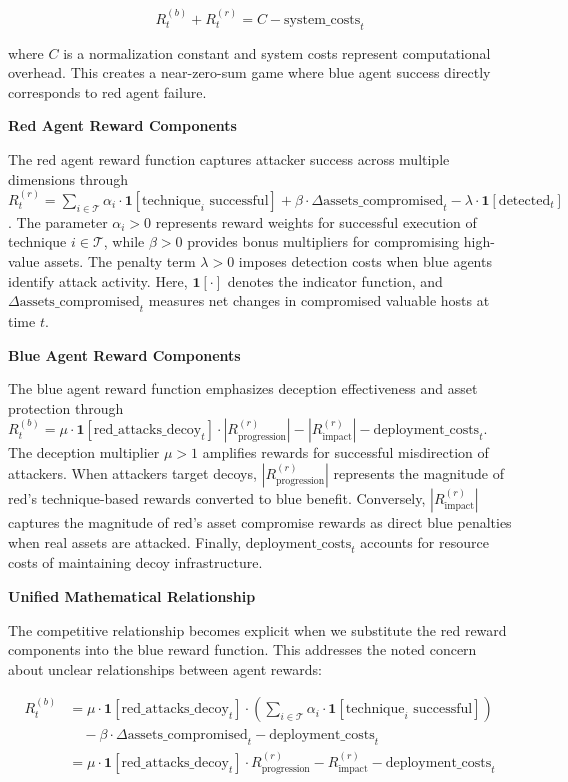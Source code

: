 \documentclass[12pt,oneside]{article}
\begin{document}
\begin{equation}
R^{(b)}_t + R^{(r)}_t = C - \text{system\_costs}_t
\end{equation}

where $C$ is a normalization constant and system costs represent computational overhead. This creates a near-zero-sum game where blue agent success directly corresponds to red agent failure.

\textbf{Red Agent Reward Components}

The red agent reward function captures attacker success across multiple dimensions through $R^{(r)}_t = \sum_{i \in \mathcal{T}} \alpha_i \cdot \mathbf{1}[\text{technique}_i \text{ successful}] + \beta \cdot \Delta\text{assets\_compromised}_t - \lambda \cdot \mathbf{1}[\text{detected}_t]$. The parameter $\alpha_i > 0$ represents reward weights for successful execution of technique $i \in \mathcal{T}$, while $\beta > 0$ provides bonus multipliers for compromising high-value assets. The penalty term $\lambda > 0$ imposes detection costs when blue agents identify attack activity. Here, $\mathbf{1}[\cdot]$ denotes the indicator function, and $\Delta\text{assets\_compromised}_t$ measures net changes in compromised valuable hosts at time $t$.

\textbf{Blue Agent Reward Components}

The blue agent reward function emphasizes deception effectiveness and asset protection through $R^{(b)}_t = \mu \cdot \mathbf{1}[\text{red\_attacks\_decoy}_t] \cdot |R^{(r)}_{\text{progression}}| - |R^{(r)}_{\text{impact}}| - \text{deployment\_costs}_t$. The deception multiplier $\mu > 1$ amplifies rewards for successful misdirection of attackers. When attackers target decoys, $|R^{(r)}_{\text{progression}}|$ represents the magnitude of red's technique-based rewards converted to blue benefit. Conversely, $|R^{(r)}_{\text{impact}}|$ captures the magnitude of red's asset compromise rewards as direct blue penalties when real assets are attacked. Finally, $\text{deployment\_costs}_t$ accounts for resource costs of maintaining decoy infrastructure.

\textbf{Unified Mathematical Relationship}

The competitive relationship becomes explicit when we substitute the red reward components into the blue reward function. This addresses the noted concern about unclear relationships between agent rewards:

\begin{align}
R^{(b)}_t &= \mu \cdot \mathbf{1}[\text{red\_attacks\_decoy}_t] \cdot \left(\sum_{i \in \mathcal{T}} \alpha_i \cdot \mathbf{1}[\text{technique}_i \text{ successful}]\right) \\
&\quad - \beta \cdot \Delta\text{assets\_compromised}_t - \text{deployment\_costs}_t \\
&= \mu \cdot \mathbf{1}[\text{red\_attacks\_decoy}_t] \cdot R^{(r)}_{\text{progression}} - R^{(r)}_{\text{impact}} - \text{deployment\_costs}_t
\end{align}
\end{document}
